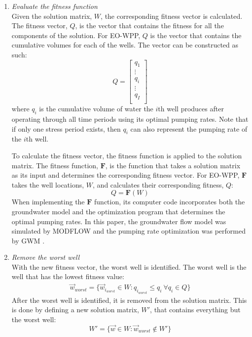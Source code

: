 \documentclass[authoryear]{elsarticle}
\begin{document}
\begin{enumerate}[Step 1:]
\item \label{EvaluateFitnessFunction}
\textit{Evaluate the fitness function}\\
Given the solution matrix, $W$, the corresponding fitness vector is calculated. The fitness vector, $Q$, is the vector that contains the fitness for all the components of the solution. For EO-WPP, $Q$ is the vector that contains the cumulative volumes for each of the wells. The vector can be constructed as such:
\begin{equation}\label{FitnessVector}
  Q = \begin{bmatrix}
        q_{1}\\
        \vdots\\
        q_{i}\\
        \vdots\\
        q_{I}\\
      \end{bmatrix}
\end{equation}
where $q_i$ is the cumulative volume of water the $i$th well produces after operating through all time periods using its optimal pumping rates. Note that if only one stress period exists, then $q_i$ can also represent the pumping rate of the $i$th well.

To calculate the fitness vector, the fitness function is applied to the solution matrix. The fitness function, $\mathbf{F}$, is the function that takes a solution matrix as its input and determines the corresponding fitness vector. For EO-WPP, $\mathbf{F}$ takes the well locations, $W$, and calculates their corresponding fitness, $Q$:
\begin{equation}\label{FitnessFunction}
  Q = \mathbf{F}(W)
\end{equation}
 When implementing the $\mathbf{F}$ function, its computer code incorporates both the groundwater model and the optimization program that determines the optimal pumping rates. In this paper, the groundwater flow model was simulated by MODFLOW \citep{mcdonald2003history} and the pumping rate optimization was performed by GWM \citep{ahlfeld2005gwm}.

\item
\textit{Remove the worst well}\\
With the new fitness vector, the worst well is identified. The worst well is the well that has the lowest fitness value:
\begin{align}
  \vec{w}_{worst}=\{\vec{w}_{i_{worst}}\in W: q_{i_{worst}}\leq q_{i}\ \forall q_{i} \in Q\}
\end{align}
After the worst well is identified, it is removed from the solution matrix. This is done by defining a new solution matrix, $W'$, that contains everything but the worst well:
\begin{equation}
  W' = \{\vec{w}\in W: \vec{w}_{worst}\notin W'\}
\end{equation}


\end{enumerate}
\end{document}
